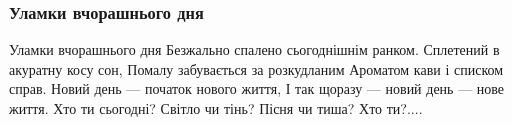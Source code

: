  
 
 

\subsubsection{Уламки вчорашнього дня}
\label{sec:poetry.rus.natalka_zhytych.ulamky_dnja}

Уламки вчорашнього дня
Безжально спалено сьогоднішнім ранком.
Сплетений в акуратну косу сон,
Помалу забувається за розкудланим
Ароматом кави і списком справ.
Новий день --- початок нового життя,
І так щоразу --- новий день --- нове життя.
Хто ти сьогодні? Світло чи тінь?
Пісня чи тиша? Хто ти?.... 
